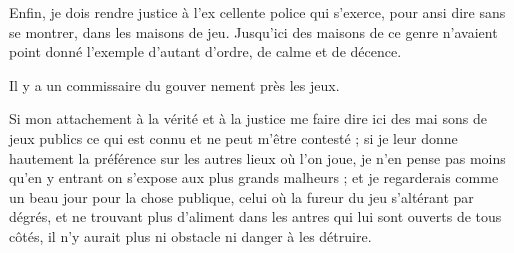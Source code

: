 Enfin, je dois rendre justice à l'ex%
cellente police qui s'exerce, pour
ansi dire sans se montrer, dans les
maisons de jeu. Jusqu'ici des maisons
de ce genre n'avaient point donné
l'exemple d'autant d'ordre, de calme
et de décence.

Il y a un commissaire du gouver%
nement près les jeux.

Si mon attachement à la vérité et
à la justice me faire dire ici des mai%
sons de jeux publics ce qui est connu
et ne peut m'être contesté ; si je leur
donne hautement la préférence sur
les autres lieux où l'on joue, je n'en
pense pas moins qu'en y entrant on
s'expose aux plus grands malheurs ;
et je regarderais comme un beau
jour pour la chose publique, celui
où la fureur du jeu s'altérant par
dégrés, et ne trouvant plus d'aliment
dans les antres qui lui sont ouverts
de tous côtés, il n'y aurait plus ni
obstacle ni danger à les détruire.

